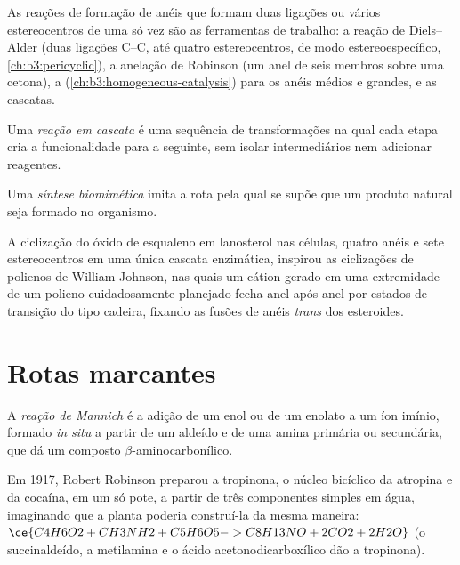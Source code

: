 As reações de formação de anéis que formam duas ligações ou vários estereocentros de uma só vez
são as ferramentas de trabalho: a reação de Diels--Alder (duas ligações C--C, até quatro
estereocentros, de modo estereoespecífico, \cref{ch:b3:pericyclic}), a anelação de
Robinson (um anel de seis membros sobre uma cetona), a 
(\cref{ch:b3:homogeneous-catalysis}) para os anéis médios e grandes, e as cascatas.

\begin{definition}\label{def:b3:total-synthesis:cascade}
Uma \emph{reação em cascata} é uma sequência de
transformações na qual cada etapa cria a funcionalidade para a seguinte,
sem isolar intermediários nem adicionar reagentes.
\end{definition}

\begin{definition}\label{def:b3:total-synthesis:biomimetic}
Uma \emph{síntese biomimética} imita a rota
pela qual se supõe que um produto natural seja formado no organismo.
\end{definition}

A ciclização do óxido de esqualeno em lanosterol nas células, quatro anéis e sete
estereocentros em uma única cascata enzimática, inspirou as ciclizações de polienos de
William Johnson, nas quais um cátion gerado em uma extremidade de um polieno cuidadosamente
planejado fecha anel após anel por estados de transição do tipo cadeira, fixando
as fusões de anéis \textit{trans} dos esteroides.

\section{Rotas marcantes}

\begin{definition}\label{def:b3:total-synthesis:mannich}
A \emph{reação de Mannich} é a adição de um enol
ou de um enolato a um íon imínio, formado \textit{in situ} a partir de um aldeído e de uma amina primária ou
secundária, que dá um composto $\beta$-aminocarbonílico.
\end{definition}

Em 1917, Robert Robinson preparou a tropinona, o núcleo bicíclico da atropina e da
cocaína, em um só pote, a partir de três componentes simples em água, imaginando que a
planta poderia construí-la da mesma maneira:
$\ce{C4H6O2 + CH3NH2 + C5H6O5 -> C8H13NO + 2CO2 + 2H2O}$ (o succinaldeído, a metilamina e o
ácido acetonodicarboxílico dão a tropinona).

